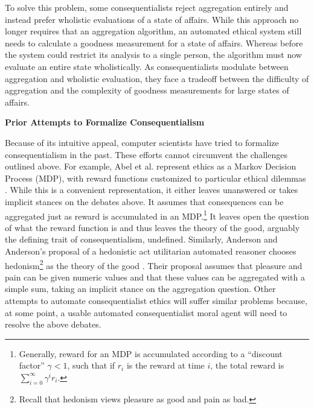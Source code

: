 \begin{isabellebody}
\begin{isamarkuptext}
To solve this problem, some consequentialists reject aggregation entirely and instead prefer wholistic
evaluations of a state of affairs. While this approach no longer requires that an 
aggregation algorithm, an automated ethical system still needs to calculate a goodness measurement for a state of 
affairs. Whereas before the system could restrict its analysis to a single person, the algorithm must now 
evaluate an entire state wholistically. As consequentialists modulate between aggregation 
and wholistic evaluation, they face a tradeoff between the difficulty of aggregation and the complexity 
of goodness measurements for large states of affairs.%
\end{isamarkuptext}\isamarkuptrue%
%
\begin{isamarkuptext}%
\noindent \textbf{Prior Attempts to Formalize Consequentialism}%
\end{isamarkuptext}\isamarkuptrue%
%
\begin{isamarkuptext}%
Because of its intuitive appeal, computer scientists have tried to formalize consequentialism in the past.
These efforts cannot circumvent the challenges outlined above. For example, Abel et al. represent ethics as a
Markov Decision Process (MDP), with reward functions customized to particular ethical dilemmas 
\citep[3]{util1}. While this is a convenient representation, it either leaves unanswered or 
takes implicit stances on the debates above. It assumes that consequences can be aggregated just as 
reward is accumulated in an MDP.\footnote{Generally, reward for an MDP is accumulated according to a 
``discount factor'' $\gamma < 1$, such that if $r_i$ is the reward at time $i$, the total reward is $\sum_{i=0}^{\infty}\gamma^i r_i$.} 
It leaves open the question of what the reward function is and thus 
leaves the theory of the good, arguably the defining trait of consequentialism, 
undefined. Similarly, Anderson and Anderson's proposal of a hedonistic act 
utilitarian automated reasoner chooses hedonism\footnote{Recall that hedonism views pleasure as good
and pain as bad.} as the theory of the good \citep[2]{util2}. Their proposal assumes that pleasure and pain can be 
given numeric values and that these values can be aggregated with a simple sum, taking an implicit
stance on the aggregation question. Other attempts to automate consequentialist ethics will suffer 
similar problems because, at some point, a usable automated consequentialist moral agent will need 
to resolve the above debates.%
\end{isamarkuptext}\isamarkuptrue%
%

\end{isabellebody}
